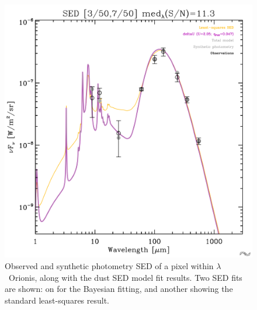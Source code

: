     \begin{figure}

      \includegraphics[width=\textwidth/2]{../Plots/ch_lori/fred_LOri_notes_Oct2017_fig1a.pdf}
      \centering
      \caption{Observed and synthetic photometry SED of a pixel within $\lambda$~Orionis, along with the dust SED model fit results. Two SED fits are shown: on for the Bayesian fitting, and another showing the standard least-squares result.}
      \label{fig:fred_LOri_notes_Oct2017_fig1a}
    \end{figure}

